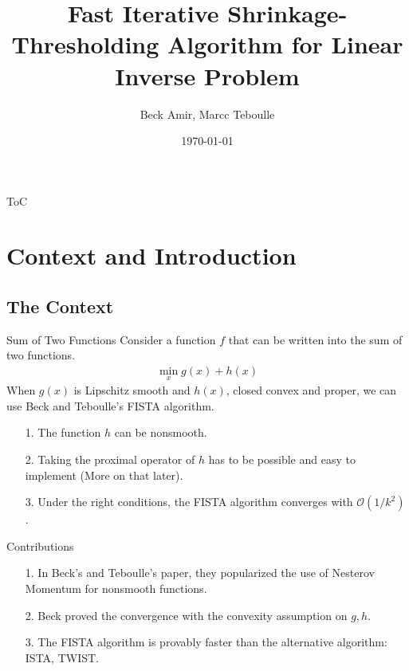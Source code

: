 \documentclass[11pt]{beamer}
\author[1]{Beck Amir, Marcc Teboulle}
\title{Fast Iterative Shrinkage-Thresholding Algorithm for Linear Inverse Problem}
\institute[]{UBC Okanagan}
\date{\today}
\begin{document}
    \begin{frame}
        \titlepage
    \end{frame}

    \begin{frame}{ToC}
        \tableofcontents
    \end{frame}

\section{Context and Introduction}
    \subsection{The Context}
        \begin{frame}{Sum of Two Functions}
            Consider a function $f$ that can be written into the sum of two functions. 
            \begin{align}
                \min_{x} g(x) + h(x)
            \end{align}  
            When $g(x)$ is Lipschitz smooth and $h(x)$, closed convex and proper, we can use Beck and Teboulle's FISTA algorithm. 
            \begin{itemize}
                \item [1.] The function $h$ can be nonsmooth. 
                \item [2.] Taking the proximal operator of $h$ has to be possible and easy to implement (More on that later).
                \item [3.] Under the right conditions, the FISTA algorithm converges with $\mathcal O(1/k^2)$. 
            \end{itemize}
        \end{frame}
        \begin{frame}{Contributions}
            \begin{itemize}
                \item [1.] In Beck's and Teboulle's paper\cite{paper:FISTA}, they popularized the use of Nesterov Momentum for nonsmooth functions. 
                \item [2.] Beck proved the convergence with the convexity assumption on $g, h$. 
                \item [3.] The FISTA algorithm is provably faster than the alternative algorithm: ISTA, TWIST. 
            \end{itemize}
        \end{frame}
\end{document}
